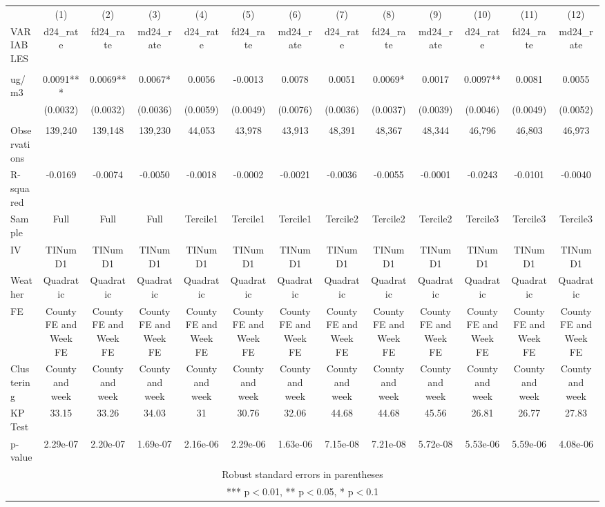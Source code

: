 \begin{tabular}{lcccccccccccc} \hline
 & (1) & (2) & (3) & (4) & (5) & (6) & (7) & (8) & (9) & (10) & (11) & (12) \\
VARIABLES & d24\_rate & fd24\_rate & md24\_rate & d24\_rate & fd24\_rate & md24\_rate & d24\_rate & fd24\_rate & md24\_rate & d24\_rate & fd24\_rate & md24\_rate \\ \hline
 &  &  &  &  &  &  &  &  &  &  &  &  \\
ug/m3 & 0.0091*** & 0.0069** & 0.0067* & 0.0056 & -0.0013 & 0.0078 & 0.0051 & 0.0069* & 0.0017 & 0.0097** & 0.0081 & 0.0055 \\
 & (0.0032) & (0.0032) & (0.0036) & (0.0059) & (0.0049) & (0.0076) & (0.0036) & (0.0037) & (0.0039) & (0.0046) & (0.0049) & (0.0052) \\
 &  &  &  &  &  &  &  &  &  &  &  &  \\
Observations & 139,240 & 139,148 & 139,230 & 44,053 & 43,978 & 43,913 & 48,391 & 48,367 & 48,344 & 46,796 & 46,803 & 46,973 \\
R-squared & -0.0169 & -0.0074 & -0.0050 & -0.0018 & -0.0002 & -0.0021 & -0.0036 & -0.0055 & -0.0001 & -0.0243 & -0.0101 & -0.0040 \\
Sample & Full & Full & Full & Tercile1 & Tercile1 & Tercile1 & Tercile2 & Tercile2 & Tercile2 & Tercile3 & Tercile3 & Tercile3 \\
IV & TINumD1 & TINumD1 & TINumD1 & TINumD1 & TINumD1 & TINumD1 & TINumD1 & TINumD1 & TINumD1 & TINumD1 & TINumD1 & TINumD1 \\
Weather & Quadratic & Quadratic & Quadratic & Quadratic & Quadratic & Quadratic & Quadratic & Quadratic & Quadratic & Quadratic & Quadratic & Quadratic \\
FE & County FE and Week FE & County FE and Week FE & County FE and Week FE & County FE and Week FE & County FE and Week FE & County FE and Week FE & County FE and Week FE & County FE and Week FE & County FE and Week FE & County FE and Week FE & County FE and Week FE & County FE and Week FE \\
Clustering & County and week & County and week & County and week & County and week & County and week & County and week & County and week & County and week & County and week & County and week & County and week & County and week \\
KP Test & 33.15 & 33.26 & 34.03 & 31 & 30.76 & 32.06 & 44.68 & 44.68 & 45.56 & 26.81 & 26.77 & 27.83 \\
 p-value & 2.29e-07 & 2.20e-07 & 1.69e-07 & 2.16e-06 & 2.29e-06 & 1.63e-06 & 7.15e-08 & 7.21e-08 & 5.72e-08 & 5.53e-06 & 5.59e-06 & 4.08e-06 \\ \hline
\multicolumn{13}{c}{ Robust standard errors in parentheses} \\
\multicolumn{13}{c}{ *** p$<$0.01, ** p$<$0.05, * p$<$0.1} \\
\end{tabular}
